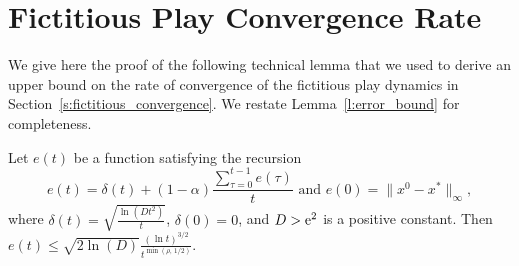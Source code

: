 \section{Fictitious Play Convergence Rate}\label{app:s:fictitious_convergence}
We give here the proof of the following technical lemma that we used to derive
an upper bound on the rate of convergence of the fictitious play dynamics in
Section~\ref{s:fictitious_convergence}.  We restate Lemma~\ref{l:error_bound} for
completeness.
\begin{lemma}
  Let $e(t)$ be a function satisfying the recursion
  \[
    e(t) =
    \delta(t) + (1-\alpha)\frac{\sum_{\tau=0}^{t-1}e(\tau)}{t}
    \text{ and } e(0)=\|x^0 - x^*\|_{\infty},
  \]
  where \(\delta(t) = \sqrt{\frac{\ln(D t^2)}{t}} \), \(\delta(0) = 0 \),
  and $D > \mathrm{e}^2$ is a positive constant.  Then
  \(
    e(t) \leq
    \sqrt{2 \ln(D)} \frac{(\ln t)^{3/2}}{t^{\min(\rho,\, 1/2)}}.
  \)
\end{lemma}
